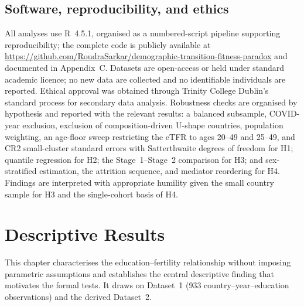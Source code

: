 \documentclass[12pt,a4paper]{report}
\begin{document}
\section{Software, reproducibility, and ethics}
All analyses use R~4.5.1, organised as a numbered-script pipeline supporting reproducibility; the
complete code is publicly available at
\url{https://github.com/RoudraSarkar/demographic-transition-fitness-paradox} and documented in
Appendix~C.
Datasets are open-access or held under standard academic licence; no new data are collected and no
identifiable individuals are reported. Ethical approval was obtained through Trinity College
Dublin's standard process for secondary data analysis. Robustness checks are organised by hypothesis
and reported with the relevant results: a balanced subsample, COVID-year exclusion, exclusion of
composition-driven U-shape countries, population weighting, an age-floor sweep restricting the
eTFR to ages 20--49 and 25--49, and CR2 small-cluster standard errors with Satterthwaite degrees of
freedom for H1;
quantile regression for H2; the Stage~1--Stage~2 comparison for H3; and sex-stratified estimation,
the attrition sequence, and mediator reordering for H4. Findings are interpreted with appropriate
humility given the small country sample for H3 and the single-cohort basis of H4.

\chapter{Descriptive Results}

This chapter characterises the education--fertility relationship without imposing parametric
assumptions and establishes the central descriptive finding that motivates the formal tests. It
draws on Dataset~1 (933 country--year--education observations) and the derived Dataset~2.
\end{document}
